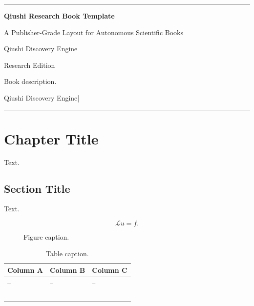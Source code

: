 \documentclass[11pt,a4paper,openany]{book}
\newcommand{\BookTitle}{Qiushi Research Book Template}
\newcommand{\BookSubtitle}{A Publisher-Grade Layout for Autonomous Scientific Books}
\newcommand{\BookAuthor}{Qiushi Discovery Engine}
\newcommand{\BookPublisher}{Qiushi Discovery Engine}
\newcommand{\BookEdition}{Research Edition}
\newcommand{\BookDate}{2026}
\newcommand{\BookDescription}{Book description.}
\theoremstyle{bookplain}
\theoremstyle{bookdefinition}
\theoremstyle{remark}
\newcommand{\MakeQiushiBookTitle}{%
\begin{titlepage}
\centering
\vspace*{12mm}
{\color{BookAccent}\rule{\textwidth}{1.1pt}}\par
\vspace{24mm}
{\sffamily\bfseries\fontsize{30}{34}\selectfont\color{BookBlue}\BookTitle\par}
\vspace{8mm}
{\sffamily\Large\color{BookMuted}\BookSubtitle\par}
\vspace{18mm}
{\Large\BookAuthor\par}
\vspace{8mm}
{\sffamily\normalsize\color{BookAccent}\BookEdition\par}
\vfill
\begin{minipage}{0.72\textwidth}
\centering
\small\color{BookMuted}\BookDescription
\end{minipage}
\vfill
{\sffamily\small \BookPublisher\quad|\quad \BookDate\par}
\vspace{8mm}
{\color{BookAccent}\rule{0.52\textwidth}{0.75pt}}\par
\end{titlepage}}
\begin{document}
\frontmatter
\MakeQiushiBookTitle
\tableofcontents

\mainmatter

\chapter{Chapter Title}

Text.

\section{Section Title}

Text.

\begin{equation}
  \mathcal{L}u = f .
\end{equation}

\begin{figure}[htbp]
\centering
\fbox{\rule{0pt}{1.8in}\rule{0.85\textwidth}{0pt}}
\caption{Figure caption.}
\end{figure}

\begin{table}[htbp]
\caption{Table caption.}
\begin{tabularx}{\textwidth}{YYY}
\toprule
Column A & Column B & Column C \\
\midrule
-- & -- & -- \\
-- & -- & -- \\
\bottomrule
\end{tabularx}
\end{table}

\backmatter

\end{document}
